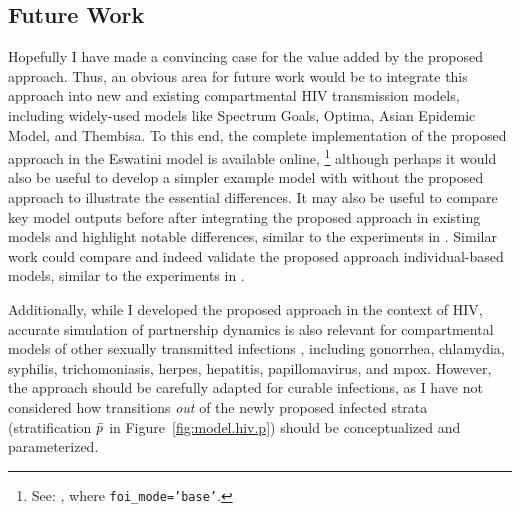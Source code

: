 \subsection{Future Work}\label{foi.disc.fw}
Hopefully I have made a convincing case for the value added by the proposed approach.
Thus, an obvious area for future work would be to integrate this approach
into new and existing compartmental HIV transmission models,
including widely-used models like Spectrum Goals, Optima, Asian Epidemic Model, and Thembisa.
To this end, the complete implementation of the proposed approach
in the Eswatini model is available online,%
\footnote{See: ,
  where \texttt{foi_mode='base'}.}
although perhaps it would also be useful to develop a simpler example model
with \vs without the proposed approach to illustrate the essential differences.
It may also be useful to compare key model outputs
before \vs after integrating the proposed approach in existing models
and highlight notable differences, similar to the experiments in .
Similar work could compare and indeed validate the proposed approach \vs individual-based models,
similar to the experiments in \cite{Johnson2016mf}.
\par
Additionally, while I developed the proposed approach in the context of HIV,
accurate simulation of partnership dynamics is also relevant for
compartmental models of other sexually transmitted infections \cite{Rao2021}, including
gonorrhea, chlamydia, syphilis, trichomoniasis, herpes, hepatitis, papillomavirus, and mpox.
However, the approach should be carefully adapted for curable infections,
as I have not considered how transitions \emph{out} of the newly proposed infected strata
(stratification $\bar{p}$ in Figure~\ref{fig:model.hiv.p}) should be conceptualized and parameterized.
